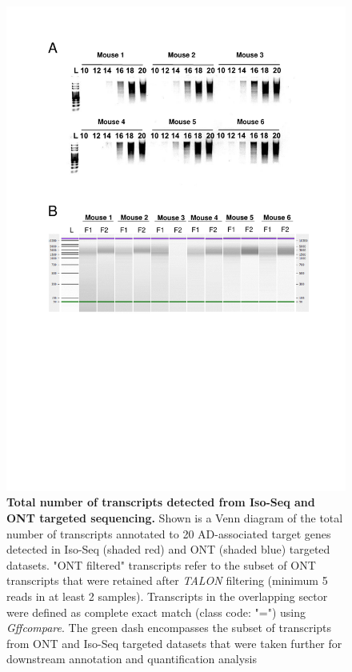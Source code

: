 \vspace{2cm}
\begin{figure}[htp]
	\centering
	\vspace{20pt}
	\includegraphics[page=4,trim={0 4cm 0 14cm},clip,scale = 0.75]{Figures/TargetedTranscriptome_LabResults.pdf}
	\captionsetup{width=0.95\textwidth}
	\caption[Finalised output from Iso-Seq and ONT targeted profiling of the rTg4510 cortex]%
	{\textbf{Total number of transcripts detected from Iso-Seq and ONT targeted sequencing.} Shown is a Venn diagram of the total number of transcripts annotated to 20 AD-associated target genes detected in Iso-Seq (shaded red) and ONT (shaded blue) targeted datasets. "ONT filtered" transcripts refer to the subset of ONT transcripts that were retained after \textit{TALON} filtering (minimum 5 reads in at least 2 samples). Transcripts in the overlapping sector were defined as complete exact match (class code: "=") using \textit{Gffcompare}. The green dash encompasses the subset of transcripts from ONT and Iso-Seq targeted datasets that were taken further for downstream annotation and quantification analysis}
	\label{fig:ont_isoseq_venn}
\end{figure}

